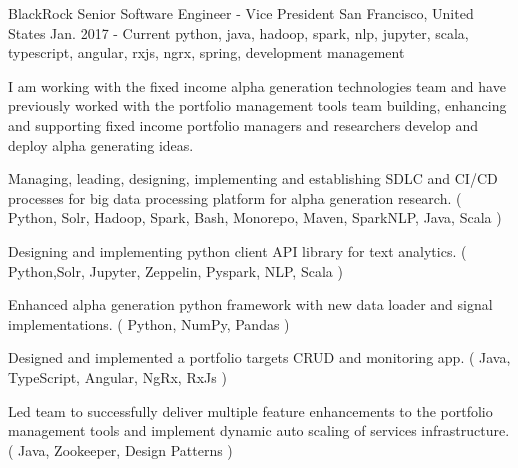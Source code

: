\cventry
    {BlackRock} %
    {Senior Software Engineer - Vice President} %
    {San Francisco, United States} %
    {Jan. 2017 - Current} %
    { python, java, hadoop, spark, nlp, jupyter, scala, typescript, angular, rxjs, ngrx, spring, development management} %
    {
        I am working with the fixed income alpha generation technologies team and have previously worked with the portfolio management tools team building,
        enhancing and supporting fixed income portfolio managers and researchers develop and deploy alpha generating ideas.
    \begin{cvitems} %
        \item { Managing, leading, designing, implementing and establishing SDLC and CI/CD processes for big data processing platform for alpha generation research. ( Python, Solr, Hadoop, Spark, Bash, Monorepo, Maven, SparkNLP, Java, Scala ) }
        \item { Designing and implementing python client API library for text analytics. ( Python,Solr, Jupyter, Zeppelin, Pyspark, NLP, Scala )}
        \item { Enhanced alpha generation python framework with new data loader and signal implementations. ( Python, NumPy, Pandas )}
        \item { Designed and implemented a portfolio targets CRUD and monitoring app. ( Java, TypeScript, Angular, NgRx, RxJs ) }
        \item { Led team to successfully deliver multiple feature enhancements to the portfolio management tools and implement dynamic auto scaling of services
        infrastructure. ( Java, Zookeeper, Design Patterns )}
    \end{cvitems}
    }





